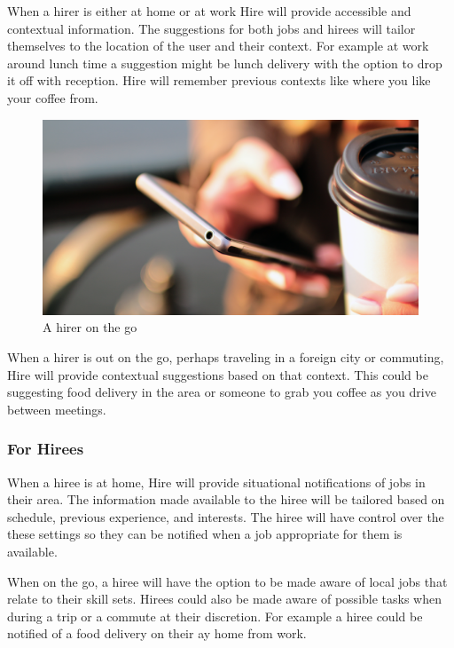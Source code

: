 \documentclass[11pt]{article}
\begin{document}
When a hirer is either at home or at work Hire will provide accessible and contextual information. The suggestions for both jobs and hirees will tailor themselves to the location of the user and their context. For example at work around lunch time a suggestion might be lunch delivery with the option to drop it off with reception. Hire will remember previous contexts like where you like your coffee from.


\begin{figure}[htb]
\begin{center}
\hspace*{-4cm}
\includegraphics[width=1.5\textwidth]{Img/hands-coffee-smartphone-technology}
\end{center}
\caption{A hirer on the go}
\end{figure}

When a hirer is out on the go, perhaps traveling in a foreign city or commuting, Hire will provide contextual suggestions based on that context. This could be suggesting food delivery in the area or someone to grab you coffee as you drive between meetings.

\subsubsection{For Hirees}

When a hiree is at home, Hire will provide situational notifications of jobs in their area. The information made available to the hiree will be tailored based on schedule, previous experience, and interests. The hiree will have control over the these settings so they can be notified when a job appropriate for them is available.

When on the go, a hiree will have the option to be made aware of local jobs that relate to their skill sets. Hirees could also be made aware of possible tasks when during a trip or a commute at their discretion. For example a hiree could be notified of a food delivery on their ay home from work.
\end{document}
